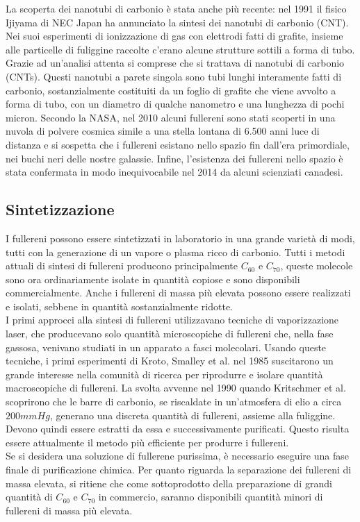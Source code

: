 \documentclass[a4paper,titlepage]{book}
\begin{document}
La scoperta dei nanotubi di carbonio è stata anche più recente: nel 1991 il fisico Ijiyama di NEC Japan ha annunciato la sintesi dei nanotubi di carbonio (CNT). Nei suoi esperimenti di ionizzazione di gas con elettrodi fatti di grafite, insieme alle particelle di fuliggine raccolte c'erano alcune strutture sottili a forma di tubo. Grazie ad un'analisi attenta si comprese che si trattava di nanotubi di carbonio (CNTs). Questi nanotubi a parete singola sono tubi lunghi interamente fatti di carbonio, sostanzialmente costituiti da un foglio di grafite che viene avvolto a forma di tubo, con un diametro di qualche nanometro e una lunghezza di pochi micron. 
Secondo la NASA, nel 2010 alcuni fullereni sono stati scoperti in una nuvola di polvere cosmica simile a una stella lontana di 6.500 anni luce di distanza e si sospetta che i fullereni esistano nello spazio fin dall'era primordiale, nei buchi neri delle nostre galassie. Infine, l'esistenza dei fullereni nello spazio è stata confermata in modo inequivocabile nel 2014 da alcuni scienziati canadesi. 

\subsection{Sintetizzazione}
I fullereni possono essere sintetizzati in laboratorio in una grande varietà di modi, tutti con la generazione di un vapore o plasma ricco di carbonio. Tutti i metodi attuali di sintesi di fullereni producono principalmente $C_{60}$ e $C_{70}$, queste molecole sono ora ordinariamente isolate in quantità copiose e sono disponibili commercialmente. Anche i fullereni di massa più elevata possono essere realizzati e isolati, sebbene in quantità sostanzialmente ridotte. \\

I primi approcci alla sintesi di fullereni utilizzavano tecniche di vaporizzazione laser, che producevano solo quantità microscopiche di fullereni che, nella fase gassosa, venivano studiati in un apparato a fasci molecolari. Usando queste tecniche, i primi esperimenti di Kroto, Smalley et al. nel 1985 suscitarono un grande interesse nella comunità di ricerca per riprodurre e isolare quantità macroscopiche di fullereni. La svolta avvenne nel 1990 quando Kritschmer et al. scoprirono che le barre di carbonio, se riscaldate in un'atmosfera di elio a circa $200 mmHg$, generano una discreta quantità di fullereni, assieme alla fuliggine. Devono quindi essere estratti da essa e successivamente purificati. Questo risulta essere attualmente il metodo più efficiente per produrre i fullereni. \\
Se si desidera una soluzione di fullerene purissima, è necessario eseguire una fase finale di purificazione chimica. Per quanto riguarda la separazione dei fullereni di massa elevata, si ritiene che come sottoprodotto della preparazione di grandi quantità di $C_{60}$ e $C_{70}$ in commercio, saranno disponibili quantità minori di fullereni di massa più elevata. \\
\end{document}
